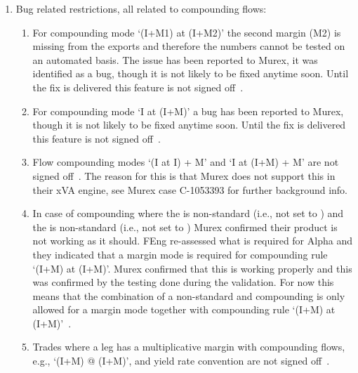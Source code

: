 \documentclass[]{pmv_report} %
\begin{document}
\begin{enumerate}
\begin{enumerate}
\begin{enumerate}
\begin{enumerate}
        \end{enumerate}
    \end{enumerate}
      \item For estimation mode , the start and end date of the rate should be a business day.
    \end{enumerate}
  \item Bug related restrictions, all related to compounding flows:
      \begin{enumerate}
          \item For compounding mode `(I+M1) at (I+M2)' the second margin (M2) is missing from the exports and therefore the numbers cannot be tested on an automated basis.
            The issue has been reported to Murex, it was identified as a bug, though it is not likely to be fixed anytime soon.
            Until the fix is delivered this feature is not signed off~\cite{MxSettings.IRS,MxSettings.IRSGenerator}.
          \item For compounding mode `I at (I+M)' a bug has been reported to Murex, though it is not likely to be fixed anytime soon.
            Until the fix is delivered this feature is not signed off~\cite{MxSettings.IRS,MxSettings.IRSGenerator}.
            \item Flow compounding modes `(I at I) + M' and `I at (I+M) + M' are not signed off~\cite{MxSettings.IRS,MxSettings.IRSGenerator}.
	       The reason for this is that Murex does not support this in their xVA engine, see Murex case C-1053393 for further background info.
          \item In case of compounding where the  is non-standard (i.e., not set to ) and the  is non-standard (i.e., not set to ) Murex confirmed their product is not working as it should.
              FEng re-assessed what is required for Alpha and they indicated that a  margin mode is required for compounding rule `(I+M) at (I+M)'.
              Murex confirmed that this is working properly and this was confirmed by the testing done during the validation.
              For now this means that the combination of a non-standard  and compounding is only allowed for a  margin mode together with compounding rule `(I+M) at (I+M)'~\cite{MxSettings.IRSGenerator}.
            \item Trades where a leg has a multiplicative margin with compounding flows, e.g., `(I+M) @ (I+M)', and yield rate convention are not signed off~\cite{MxSettings.IRSGenerator}.

\end{enumerate}
\end{enumerate}
\end{document}
